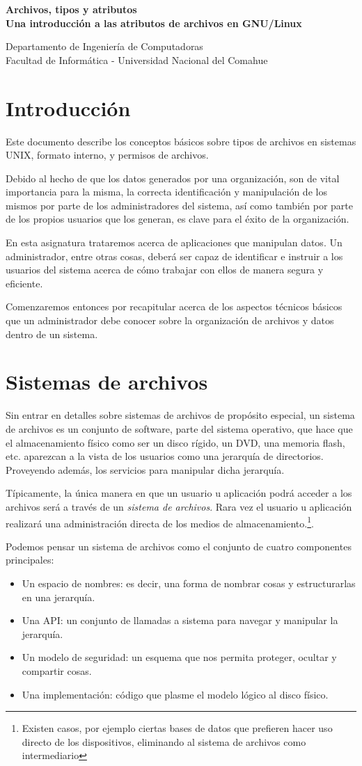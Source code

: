 \documentclass[12pt]{article}
\def\maketitle{

\makeatletter
{\color{bl} \centering \huge \sc \textbf{
Archivos, tipos y atributos \\
\large \vspace*{-8pt} \color{black} Una introducción a las atributos de archivos en GNU/Linux
 \vspace*{8pt} }\par}
 \makeatother


 \makeatletter
 {\centering \small 
 	Departamento de Ingeniería de Computadoras \\
 	Facultad de Informática - Universidad Nacional del Comahue \\
 	\vspace{20pt} }
 \makeatother

}
\begin{document}
\thispagestyle{empty}
\maketitle
\setlength{\parindent}{0pt}


\section*{Introducción}
Este documento describe los conceptos básicos sobre tipos de archivos en 
sistemas UNIX, formato interno, y permisos de archivos. 

Debido al hecho de que los datos generados por una organización, son de vital
importancia para la misma, la correcta identificación y manipulación de los 
mismos por parte de los administradores del sistema, así como 
también por parte de los propios usuarios que los generan, es clave para el 
éxito de la organización. 

En esta asignatura trataremos acerca de aplicaciones que manipulan datos. 
Un administrador, entre otras cosas, deberá ser capaz de identificar e instruir 
a los usuarios del sistema acerca de cómo trabajar con ellos de manera segura
y eficiente. 

Comenzaremos entonces por recapitular acerca de los aspectos técnicos básicos
que un administrador debe conocer sobre la organización de archivos y datos 
dentro de un sistema. 

\section*{Sistemas de archivos}
Sin entrar en detalles sobre sistemas de archivos de propósito especial, un 
sistema de archivos es un conjunto de software, parte del sistema operativo,
que hace que el almacenamiento físico como ser un disco rígido, un DVD, una 
memoria flash, etc. aparezcan a la vista de los usuarios como una jerarquía
de directorios. Proveyendo además, los servicios para manipular dicha 
jerarquía. 

Típicamente, la única manera en que un usuario u aplicación podrá acceder a 
los archivos será a través de un \textit{sistema de archivos}. Rara vez el 
usuario u aplicación realizará una administración directa de los medios de
almacenamiento.\footnote{Existen casos, por ejemplo ciertas bases de datos 
que prefieren hacer uso directo de los dispositivos, eliminando al sistema 
de archivos como intermediario}.

Podemos pensar un sistema de archivos como el conjunto de cuatro componentes
principales:
\begin{itemize}
\item Un espacio de nombres: es decir, una forma de nombrar cosas y 
estructurarlas en una jerarquía. 
\item Una API: un conjunto de llamadas a sistema para navegar y manipular
la jerarquía. 
\item Un modelo de seguridad: un esquema que nos permita proteger, ocultar y
compartir cosas. 
\item Una implementación: código que plasme el modelo lógico al disco 
físico.
\end{itemize}
\end{document}
